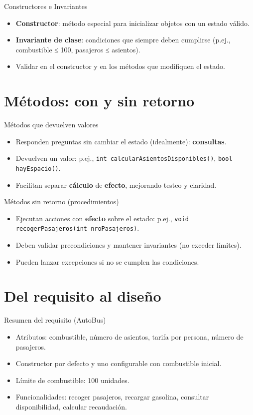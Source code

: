 \documentclass[aspectratio=169]{beamer}
\begin{document}
\begin{frame}{Constructores e Invariantes}
  \begin{itemize}
    \item \textbf{Constructor}: método especial para inicializar objetos con un estado válido.
    \item \textbf{Invariante de clase}: condiciones que siempre deben cumplirse (p.ej., combustible ≤ 100, pasajeros ≤ asientos).
    \item Validar en el constructor y en los métodos que modifiquen el estado.
  \end{itemize}
\end{frame}

\section{Métodos: con y sin retorno}

\begin{frame}{Métodos que devuelven valores}
  \begin{itemize}
    \item Responden preguntas sin cambiar el estado (idealmente): \textbf{consultas}.
    \item Devuelven un valor: p.ej., \texttt{int calcularAsientosDisponibles()}, \texttt{bool hayEspacio()}.
    \item Facilitan separar \textbf{cálculo} de \textbf{efecto}, mejorando testeo y claridad.
  \end{itemize}
\end{frame}

\begin{frame}{Métodos sin retorno (procedimientos)}
  \begin{itemize}
    \item Ejecutan acciones con \textbf{efecto} sobre el estado: p.ej., \texttt{void recogerPasajeros(int nroPasajeros)}.
    \item Deben validar precondiciones y mantener invariantes (no exceder límites).
    \item Pueden lanzar excepciones si no se cumplen las condiciones.
  \end{itemize}
\end{frame}

\section{Del requisito al diseño}

\begin{frame}{Resumen del requisito (AutoBus)}
  \begin{itemize}
    \item Atributos: combustible, número de asientos, tarifa por persona, número de pasajeros.
    \item Constructor por defecto y uno configurable con combustible inicial.
    \item Límite de combustible: 100 unidades.
    \item Funcionalidades: recoger pasajeros, recargar gasolina, consultar disponibilidad, calcular recaudación.
  \end{itemize}
\end{frame}
\end{document}
